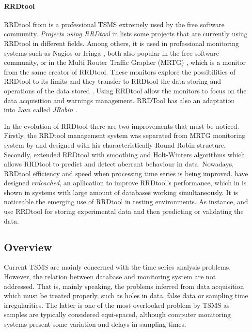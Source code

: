 \paragraph{RRDtool} RRDtool from \textcite{rrdtool} is a professional TSMS extremely used by the free software community. \emph{Projects using RRDtool} in \cite{rrdtool} lists some projects that are currently using RRDtool in different fields. Among others, it is used in professional monitoring systems such as Nagios \parencite{nagios} or Icinga \parencite{icinga}, both also popular in the free software community, or  in the Multi Router Traffic Grapher (MRTG) \parencite{mrtg}, which is a monitor from the same creator of RRDtool. 
These monitors explore the possibilities of RRDtool to its limits and they transfer to RRDtool the data storing and operations of the data stored . 
Using RRDtool allow the monitors to focus on the data acquisition and warnings management. RRDTool has also an adaptation into Java called \emph{JRobin} \parencite{jrobin}.


In the evolution of RRDtool there are two improvements that must be noticed.
Firstly, the RRDtool management system was separated from MRTG monitoring system by \textcite{lisa98:oetiker} and designed with his characteristically Round Robin structure. Secondly, \textcite{lisa00:brutlag} extended RRDtool with smoothing and Holt-Winters algorithms which allows RRDtool to predict and detect aberrant behaviour in data.  
Nowadays, RRDtool efficiency and speed when processing time series is being improved. \textcite{carder:rrdcached} have designed \emph{rrdcached}, an apllication to improve RRDtool's performance, which in \cite{lisa07:plonka} is shown  in systems with large amount of databases working simultaneously.
It is noticeable the emerging use of RRDtool in testing environments. As instance, \textcite{zhang07} and \textcite{chilingaryan10} use RRDtool for storing experimental data and then predicting or validating the data.


\subsection{Overview}

Current TSMS are mainly concerned with the time series analysis problems. However, the relation between database and monitoring system are not addressed. That is, mainly speaking, the problems inferred from data acquisition which  must be treated properly, such as holes in data, false data or sampling time irregularities. 
The latter is one of the most overlooked problem by TSMS as samples are typically considered equi-spaced, although computer monitoring systems present some variation and delays in sampling times. 

